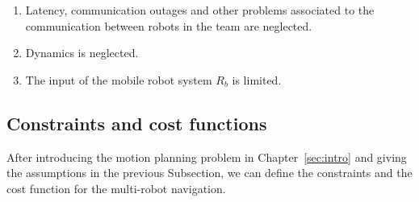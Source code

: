 \begin{enumerate}
    \item Latency, communication outages and other problems associated
    to the communication between robots in the team are neglected.
        
    \item Dynamics is neglected.
    
    \item The input of the mobile robot system $R_b$ is limited.
    

%    

\end{enumerate}

\subsection{Constraints and cost functions}

After introducing the motion planning problem in
Chapter~\ref{sec:intro} and giving the assumptions in the previous Subsection,
we can define the constraints and the cost function for the
multi-robot navigation.

